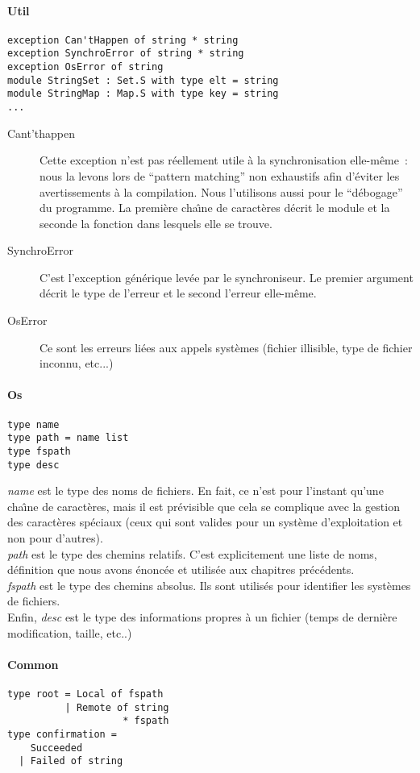 \documentclass[11pt]{report}
\newcommand{\data}[1]{\emph{#1}}
\begin{document}
{\paragraph{Util}
\begin{verbatim}
exception Can'tHappen of string * string
exception SynchroError of string * string
exception OsError of string
module StringSet : Set.S with type elt = string
module StringMap : Map.S with type key = string
...
\end{verbatim}
\begin{description}
\item [Cant'thappen] Cette exception n'est pas r\'eellement utile \`a la
  synchronisation elle-m\^eme~: nous la levons lors de ``pattern matching''
non exhaustifs afin d'\'eviter les avertissements \`a la compilation. Nous
l'utilisons aussi pour le ``d\'ebogage'' du programme. La premi\`ere cha\^{\i}ne
de caract\`eres d\'ecrit le module et la seconde la fonction dans lesquels 
elle se trouve.
\item [SynchroError] C'est l'exception g\'en\'erique lev\'ee par le
  synchroniseur. Le premier argument d\'ecrit le type de l'erreur et le 
second l'erreur elle-m\^eme.
\item [OsError] Ce sont les erreurs li\'ees aux appels syst\`emes (fichier
  illisible, type de fichier inconnu, etc...)
\end{description}
\paragraph{Os}
\begin{verbatim}
type name
type path = name list
type fspath
type desc
\end{verbatim}
\data{name} est le type des noms de fichiers. En fait, ce n'est pour 
l'instant qu'une cha\^{\i}ne de caract\`eres, mais il est pr\'evisible que cela se
complique avec la gestion des caract\`eres sp\'eciaux (ceux qui sont valides
pour un syst\`eme d'exploitation et non pour d'autres).\\
\data{path} est le type des chemins relatifs. C'est explicitement une liste de noms,
d\'efinition que nous avons \'enonc\'ee et utilis\'ee aux chapitres 
pr\'ec\'edents.\\
\data{fspath} est le type des chemins absolus. Ils sont utilis\'es pour
identifier les syst\`emes de fichiers.\\
Enfin, \data{desc} est le type des informations propres \`a un
fichier (temps de derni\`ere modification, taille, etc..)
\paragraph{Common}
\begin{verbatim}
type root = Local of fspath  
          | Remote of string
                    * fspath 
type confirmation =
    Succeeded
  | Failed of string


\end{verbatim}}
\end{document}
